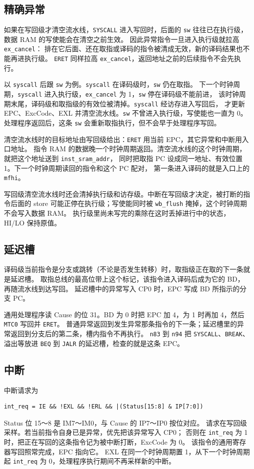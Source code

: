 \documentclass{article}
\begin{document}
\subsection{精确异常}
如果在写回级才清空流水线，\texttt{SYSCALL} 进入写回时，后面的 \texttt{sw} 往往已在执行级，
数据 RAM 的写使能会在清空之前生效。
因此异常指令一旦进入执行级就拉高 \texttt{ex\_cancel}：
排在它后面、还在取指或译码的指令被清成无效，新的译码结果也不能再进执行级。
\texttt{ERET} 同样拉高 \texttt{ex\_cancel}，返回地址之前的后续指令不会先执行。

以 \texttt{syscall} 后跟 \texttt{sw} 为例。\texttt{syscall} 在译码级时，\texttt{sw} 仍在取指。
下一个时钟周期，\texttt{syscall} 进入执行级，\texttt{ex\_cancel} 为 1，\texttt{sw} 停在译码级不能前进，
该时钟周期末尾，译码级和取指级的有效位被清掉。\texttt{syscall} 经访存进入写回后，
才更新 EPC、ExcCode、EXL 并清空流水线。\texttt{sw} 不曾进入执行级，写使能也一直为 0。
处理程序返回后，这条 \texttt{sw} 会重新取指执行，但不会早于处理程序写回。

清空流水线时的目标地址由写回级给出：\texttt{ERET} 用当前 EPC，其它异常和中断用入口地址。
指令 RAM 的数据晚一个时钟周期返回。清空流水线的这个时钟周期，就把这个地址送到 \texttt{inst\_sram\_addr}，
同时把取指 PC 设成同一地址、有效位置 1。下一个时钟周期读回的指令和这个 PC 配对，
第一条进入译码的就是入口上的 \texttt{mfhi}。

写回级清空流水线时还会清掉执行级和访存级。中断在写回级才决定，被打断的指令后面的 store
可能正停在执行级；写使能同时被 \texttt{wb\_flush} 掩掉，这个时钟周期不会写入数据 RAM。
执行级里尚未写完的乘除在这时丢掉进行中的状态，HI/LO 保持原值。

\subsection{延迟槽}
译码级当前指令是分支或跳转（不论是否发生转移）时，取指级正在取的下一条就是延迟槽。
取指总线的最高位带上这个标记，该指令进入译码后成为它的 BD，再随流水线到达写回。
延迟槽中的异常写入 CP0 时，EPC 写成 BD 所指示的分支 PC。

通用处理程序读 Cause 的位 31。BD 为 0 时把 EPC 加 4，为 1 时再加 4，然后 \texttt{MTC0} 写回并 \texttt{ERET}。
普通异常返回到发生异常那条指令的下一条；延迟槽里的异常返回到分支后的第二条，槽内指令不再执行。
\texttt{n83} 到 \texttt{n94} 把 \texttt{SYSCALL}、\texttt{BREAK}、溢出等放进
\texttt{BEQ} 到 \texttt{JALR} 的延迟槽，检查的就是这条 EPC。

\subsection{中断}
中断请求为
\begin{verbatim}
int_req = IE && !EXL && !ERL && |(Status[15:8] & IP[7:0])
\end{verbatim}
Status 位 15～8 是 IM7～IM0，与 Cause 的 IP7～IP0 按位对应。
请求在写回级采样。若当前指令自身已是异常，优先把该异常写入 CP0；
否则在 \texttt{int\_req} 为 1 时，把正在写回的这条指令记为被中断打断，ExcCode 为 0。
该指令的通用寄存器写回照常完成，EPC 指向它。
EXL 在同一个时钟周期置 1，从下一个时钟周期起 \texttt{int\_req} 为 0，处理程序执行期间不再采样新的中断。
\end{document}
